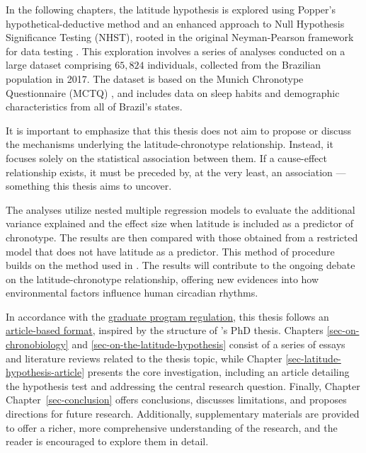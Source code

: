 \documentclass[
12pt,
openright,
oneside,
a4paper,
chapter=TITLE,
section=TITLE,
french,
spanish,
brazil,
english
]{abntex2}
\begin{document}
In the following chapters, the latitude hypothesis is explored using
Popper's hypothetical-deductive method \autocite{popper1979} and an
enhanced approach to Null Hypothesis Significance Testing (NHST), rooted
in the original Neyman-Pearson framework for data testing
\autocite{neyman1928,neyman1928a,perezgonzalez2015}. This exploration
involves a series of analyses conducted on a large dataset comprising
\(65,824\) individuals, collected from the Brazilian population in 2017.
The dataset is based on the Munich Chronotype Questionnaire (MCTQ)
\autocite{roenneberg2003,roenneberg2012a}, and includes data on sleep
habits and demographic characteristics from all of Brazil's states.

It is important to emphasize that this thesis does not aim to propose or
discuss the mechanisms underlying the latitude-chronotype relationship.
Instead, it focuses solely on the statistical association between them.
If a cause-effect relationship exists, it must be preceded by, at the
very least, an association --- something this thesis aims to uncover.

The analyses utilize nested multiple regression models to evaluate the
additional variance explained and the effect size when latitude is
included as a predictor of chronotype. The results are then compared
with those obtained from a restricted model that does not have latitude
as a predictor. This method of procedure builds on the method used in
\textcite{leocadio-miguel2017}. The results will contribute to the
ongoing debate on the latitude-chronotype relationship, offering new
evidences into how environmental factors influence human circadian
rhythms.

In accordance with the
\href{https://leginf.usp.br/?resolucao=resolucao-copgr-no-7829-de-03-de-outubro-de-2019\#:~:text=XI\%20\%E2\%80\%93\%20PROCEDIMENTOS\%20PARA\%20DEP\%C3\%93SITO\%20DA\%20DISSERTA\%C3\%87\%C3\%83O}{graduate
program regulation}, this thesis follows an
\href{https://en.wikipedia.org/wiki/Collection_of_articles}{article-based
format}, inspired by the structure of \textcite{reis2020}'s PhD thesis.
Chapters \ref{sec-on-chronobiology} and
\ref{sec-on-the-latitude-hypothesis} consist of a series of essays and
literature reviews related to the thesis topic, while Chapter
\ref{sec-latitude-hypothesis-article} presents the core investigation,
including an article detailing the hypothesis test and addressing the
central research question. Finally, Chapter Chapter~\ref{sec-conclusion}
offers conclusions, discusses limitations, and proposes directions for
future research. Additionally, supplementary materials are provided to
offer a richer, more comprehensive understanding of the research, and
the reader is encouraged to explore them in detail.
\end{document}
